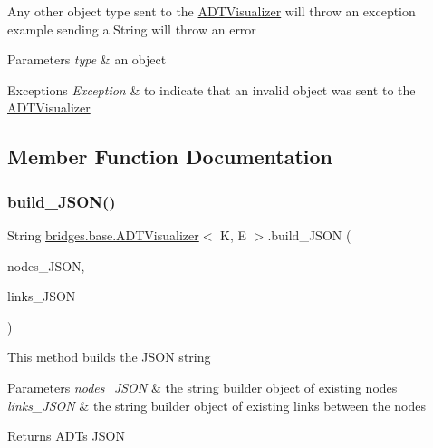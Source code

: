 Any other object type sent to the \hyperlink{classbridges_1_1base_1_1_a_d_t_visualizer}{A\+D\+T\+Visualizer} will throw an exception example sending a String will throw an error 
\begin{DoxyParams}{Parameters}
{\em type} & an object \\
\hline
\end{DoxyParams}

\begin{DoxyExceptions}{Exceptions}
{\em Exception} & to indicate that an invalid object was sent to the \hyperlink{classbridges_1_1base_1_1_a_d_t_visualizer}{A\+D\+T\+Visualizer} \\
\hline
\end{DoxyExceptions}


\subsection{Member Function Documentation}
\hypertarget{classbridges_1_1base_1_1_a_d_t_visualizer_a86ec26c0bb98a48a63366ce380ca958f}{}\label{classbridges_1_1base_1_1_a_d_t_visualizer_a86ec26c0bb98a48a63366ce380ca958f} 
\subsubsection{\texorpdfstring{build\+\_\+\+J\+S\+O\+N()}{build\_JSON()}\hspace{0.1cm}{\footnotesize\ttfamily [1/2]}}
{\footnotesize\ttfamily String \hyperlink{classbridges_1_1base_1_1_a_d_t_visualizer}{bridges.\+base.\+A\+D\+T\+Visualizer}$<$ K, E $>$.build\+\_\+\+J\+S\+ON (\begin{DoxyParamCaption}\item[{String\+Builder}]{nodes\+\_\+\+J\+S\+ON,  }\item[{String\+Builder}]{links\+\_\+\+J\+S\+ON }\end{DoxyParamCaption})}

This method builds the J\+S\+ON string 
\begin{DoxyParams}{Parameters}
{\em nodes\+\_\+\+J\+S\+ON} & the string builder object of existing nodes \\
\hline
{\em links\+\_\+\+J\+S\+ON} & the string builder object of existing links between the nodes \\
\hline
\end{DoxyParams}
\begin{DoxyReturn}{Returns}
A\+DT\textquotesingle{}s J\+S\+ON 
\end{DoxyReturn}
\hypertarget{classbridges_1_1base_1_1_a_d_t_visualizer_a520eef21260f327101b7e013f9814c45}{}\label{classbridges_1_1base_1_1_a_d_t_visualizer_a520eef21260f327101b7e013f9814c45} 
